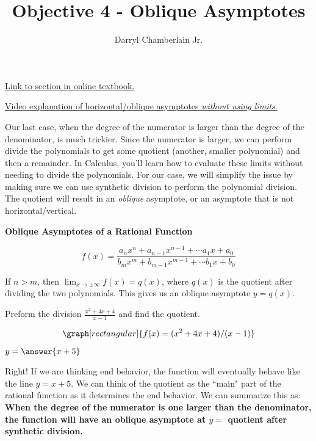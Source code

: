 \documentclass{ximera}
\author{Darryl Chamberlain Jr.}
\title{Objective 4 - Oblique Asymptotes}
\begin{document}
\begin{abstract}

\end{abstract}
\maketitle
 
\href{https://cnx.org/contents/mwjClAV_@8.21:KNTP2r7D@14/Rational-Functions}{Link to section in online textbook.}

\href{https://mediasite.video.ufl.edu/Mediasite/Play/0957426faa87413085c428f14dc054e71d}{Video explanation of horizontal/oblique asymptotes \textit{without using limits}.}
 

Our last case, when the degree of the numerator is larger than the degree of the denominator, is much trickier. Since the numerator is larger, we can perform divide the polynomials to get some quotient (another, smaller polynomial) and then a remainder. In Calculus, you'll learn how to evaluate these limits without needing to divide the polynomials. For our case, we will simplify the issue by making sure we can use synthetic division to perform the polynomial division. The quotient will result in an \textit{oblique} asymptote, or an asymptote that is not horizontal/vertical.

\begin{theorem}
\textbf{Oblique Asymptotes of a Rational Function}

$$ f(x) = \frac{a_nx^n + a_{n-1}x^{n-1} + \cdots a_1 x + a_0}{b_mx^m + b_{m-1}x^{m-1} + \cdots b_1 x + b_0} $$

If $n > m$, then $\lim_{x \rightarrow \pm \infty} f(x) = q(x)$, where $q(x)$ is the quotient after dividing the two polynomials. This gives us an oblique asymptote $y = q(x)$.
\end{theorem}
 
\begin{question}
Preform the division $\frac{x^2+4x+4}{x-1}$ and find the quotient.
 
\[
\graph[rectangular]{f(x) = (x^2+4x+4)/(x-1)}
\]
 
$y = \answer{x+5}$
 
\begin{feedback}[correct]
Right! If we are thinking end behavior, the function will eventually behave like the line $y=x+5$. We can think of the quotient as the ``main" part of the rational function as it determines the end behavior. We can summarize this as: \textbf{When the degree of the numerator is one larger than the denominator, the function will have an oblique asymptote at $y = $ quotient after synthetic division.}
\end{feedback}
\end{question}
\end{document}
